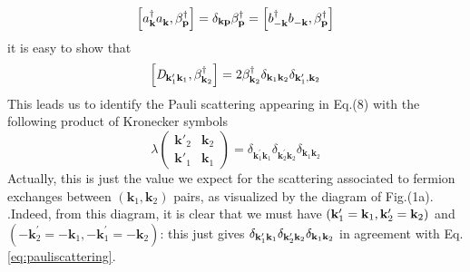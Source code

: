 \documentclass[aps,prb,superscriptaddress,twocolumn]{revtex4}
\newcommand{\vk}{\ensuremath{\mathbf{k}}}
\begin{document}
\begin{equation}  \label{eq:aBeta}
\left[a^{\dagger}_{\mathbf{k} }a^{}_{\mathbf{k} },\beta^{\dagger}_{\mathbf{p}
}\right]  =\delta_{\mathbf{k} \mathbf{p} }\beta^{\dagger}_{\mathbf{p} }=%
\left[b^{\dagger}_{-\mathbf{k} }b^{}_{-\mathbf{k} },\beta^{\dagger}_{\mathbf{%
p} }\right]  
\end{equation}
it is easy to show that 
\begin{equation}  \label{eq:Dcom}
\left[\mathit{D} _{\mathbf{k} ^{\prime}_1\mathbf{k} _1},\beta^{\dagger}_{%
\mathbf{k} _2}\right]  =2\beta^{\dagger}_{\mathbf{k} _2}\delta_{\mathbf{k} _1%
\mathbf{k} _2}\delta_{\mathbf{k} ^{\prime}_1,\mathbf{k} _2}
\end{equation}
This leads us to identify the Pauli scattering appearing in Eq.(8) with the following
product of Kronecker symbols 
\begin{equation}  \label{eq:pauliscattering}
\lambda\left(\begin{smallmatrix}\vk'_2&\vk_2\\\vk'_1&\vk_1\end{smallmatrix}%
\right)  =\delta_{\mathbf{k} ^{\prime}_1\mathbf{k} _1}\delta_{\mathbf{k}
^{\prime}_2\mathbf{k} _2}\delta_{\mathbf{k} _1\mathbf{k} _2}
\end{equation}
Actually, this is just the value we expect for the scattering associated to
fermion exchanges between $\left(\mathbf{k} _1,\mathbf{k} _2\right) $ pairs,
as visualized by the diagram of Fig.(1a). 
.Indeed, from this
diagram, it is clear that we must have $\left(\mathbf{k} ^{\prime}_1=\mathbf{%
k} _1,\mathbf{k} ^{\prime}_2=\mathbf{k} _2\right) $ and $\left(-\mathbf{k}
^{\prime}_2=-\mathbf{k} _1,-\mathbf{k} ^{\prime}_1=-\mathbf{k} _2\right) $:
this just gives $\delta_{\mathbf{k} ^{\prime}_1\mathbf{k} _1}\delta_{\mathbf{%
k} ^{\prime}_2\mathbf{k} _2}\delta_{\mathbf{k} _1\mathbf{k} _2}$ in
agreement with Eq.\eqref{eq:pauliscattering}.
\end{document}
